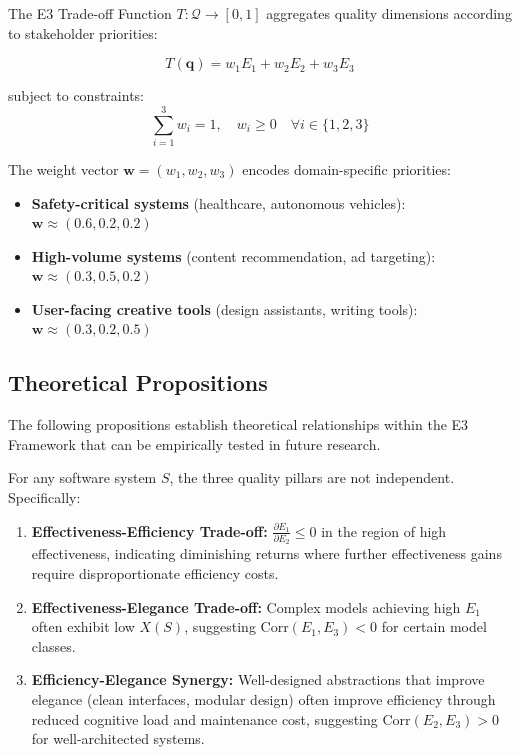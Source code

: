 \begin{definition}
\label{def:tradeoff}
The E3 Trade-off Function $T: \mathcal{Q} \rightarrow [0,1]$ aggregates quality dimensions according to stakeholder priorities:

\begin{equation}
T(\mathbf{q}) = w_1 E_1 + w_2 E_2 + w_3 E_3
\end{equation}

subject to constraints:
\begin{equation}
\sum_{i=1}^{3} w_i = 1, \quad w_i \geq 0 \quad \forall i \in \{1, 2, 3\}
\end{equation}

The weight vector $\mathbf{w} = (w_1, w_2, w_3)$ encodes domain-specific priorities:
\begin{itemize}[leftmargin=2em]
    \item \textbf{Safety-critical systems} (healthcare, autonomous vehicles): $\mathbf{w} \approx (0.6, 0.2, 0.2)$
    \item \textbf{High-volume systems} (content recommendation, ad targeting): $\mathbf{w} \approx (0.3, 0.5, 0.2)$
    \item \textbf{User-facing creative tools} (design assistants, writing tools): $\mathbf{w} \approx (0.3, 0.2, 0.5)$
\end{itemize}
\end{definition}

\subsection{Theoretical Propositions}

The following propositions establish theoretical relationships within the E3 Framework that can be empirically tested in future research.

\begin{proposition}
\label{prop:interdependence}
For any software system $S$, the three quality pillars are not independent. Specifically:

\begin{enumerate}[leftmargin=2em]
    \item \textbf{Effectiveness-Efficiency Trade-off:} $\frac{\partial E_1}{\partial E_2} \leq 0$ in the region of high effectiveness, indicating diminishing returns where further effectiveness gains require disproportionate efficiency costs.
    
    \item \textbf{Effectiveness-Elegance Trade-off:} Complex models achieving high $E_1$ often exhibit low $X(S)$, suggesting $\text{Corr}(E_1, E_3) < 0$ for certain model classes.
    
    \item \textbf{Efficiency-Elegance Synergy:} Well-designed abstractions that improve elegance (clean interfaces, modular design) often improve efficiency through reduced cognitive load and maintenance cost, suggesting $\text{Corr}(E_2, E_3) > 0$ for well-architected systems.
\end{enumerate}
\end{proposition}

